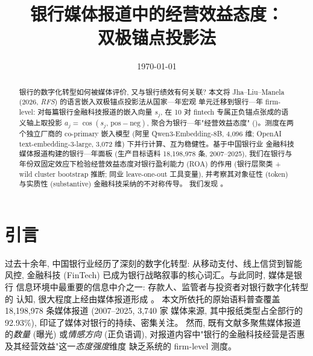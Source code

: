 




\title{银行媒体报道中的经营效益态度：\\双极锚点投影法}
\author{}
\date{\today}


\maketitle

\begin{abstract}
银行的数字化转型如何被媒体评价, 又与银行绩效有何关联?
本文将 Jha--Liu--Manela (2026, \emph{RFS}) 的语言嵌入双极锚点投影法从国家—年宏观
单元迁移到银行—年 firm-level: 对每篇银行金融科技报道的嵌入向量 $s_j$, 在 10 对
fintech 专属正负锚点张成的语义轴上取投影 $a_j=\cos(s_j,\,\mathrm{pos}-\mathrm{neg})$,
聚合为银行—年"经营效益态度" ()。测度在两个独立厂商的
co-primary 嵌入模型 (阿里 Qwen3-Embedding-8B, 4{,}096 维; OpenAI
text-embedding-3-large, 3{,}072 维) 下并行计算、互为稳健性。基于中国银行业
金融科技媒体报道构建的银行—年面板 (生产目标语料 18{,}198{,}978 条, 2007--2025),
我们在银行与年份双固定效应下检验经营效益态度对银行盈利能力 (ROA) 的作用
(银行层聚类 + wild cluster bootstrap 推断; 同业 leave-one-out 工具变量),
并考察其对象征性 (token) 与实质性 (substantive) 金融科技采纳的不对称传导。
我们发现 \@。
\end{abstract}

\section{引言}\label{sec:intro}

过去十余年, 中国银行业经历了深刻的数字化转型: 从移动支付、线上信贷到智能
风控, 金融科技 (FinTech) 已成为银行战略叙事的核心词汇。与此同时, 媒体是银行
信息环境中最重要的信息中介之一: 存款人、监管者与投资者对银行数字化转型的
认知, 很大程度上经由媒体报道形成 \parencite{tetlock2007content,fang2009media}。
本文所依托的原始语料普查覆盖 18{,}198{,}978 条媒体报道 (2007--2025, 3{,}740 家
媒体来源, 其中报纸类型占全部行的 92.93\%), 印证了媒体对银行的持续、密集关注。
然而, 既有文献多聚焦媒体报道的\emph{数量} (曝光) 或\emph{情感方向} (正负语调),
对报道内容中"银行的金融科技经营是否惠及其经营效益"这一\emph{态度强度}维度
缺乏系统的 firm-level 测度。


